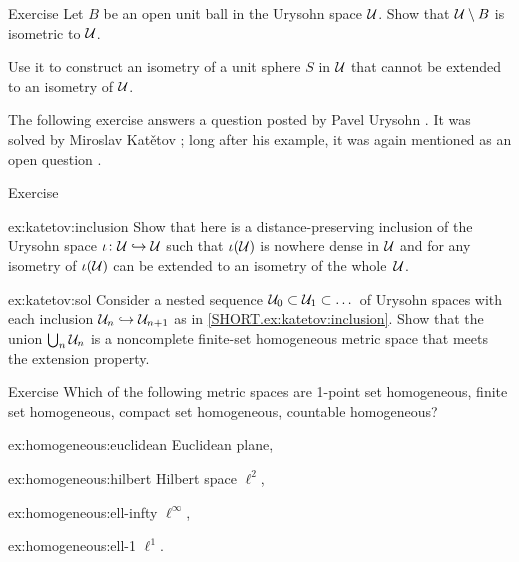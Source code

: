 \begin{thm}{Exercise}\label{ex:ext(shere)}
Let $B$ be an open unit ball in the Urysohn space $\mathcal{U}$.
Show that $\mathcal{U}\setminus B$ is isometric to $\mathcal{U}$.

Use it to construct an isometry of a unit sphere $S$ in $\mathcal{U}$ that cannot be extended to an isometry of $\mathcal{U}$.
\end{thm}

The following exercise answers a question posted by Pavel Urysohn \cite[§$2(6)$]{urysohn}.
It was solved by Miroslav Katětov \cite{katetov};
long after his example, it was again mentioned as an open question \cite[p. 83]{gromov-2007}.

\begin{thm}{Exercise}\label{ex:katetov}

\begin{subthm}{ex:katetov:inclusion}
Show that here is a distance-preserving inclusion of the Urysohn space $\iota\colon\mathcal{U}\hookrightarrow \mathcal{U}$ 
such that $\iota(\mathcal{U})$ is nowhere dense in $\mathcal{U}$ and for any isometry of $\iota(\mathcal{U})$ 
can be extended to an isometry of the whole~$\mathcal{U}$.
\end{subthm}

\begin{subthm}{ex:katetov:sol}
Consider a nested sequence $\mathcal{U}_0\subset \mathcal{U}_1\subset\dots$ of Urysohn spaces 
with each inclusion $\mathcal{U}_n\hookrightarrow \mathcal{U}_{n+1}$ as in \ref{SHORT.ex:katetov:inclusion}.
Show that the union $\bigcup_n\mathcal{U}_n$ is a noncomplete finite-set homogeneous metric space that meets the extension property.
\end{subthm}

\end{thm}

\begin{thm}{Exercise}\label{ex:homogeneous}
Which of the following metric spaces are 
1-point set homogeneous, finite set homogeneous, compact set homogeneous, countable homogeneous?

\begin{subthm}{ex:homogeneous:euclidean}
Euclidean plane,
\end{subthm}

\begin{subthm}{ex:homogeneous:hilbert}
 Hilbert space $\ell^2$,
\end{subthm}

\begin{subthm}{ex:homogeneous:ell-infty}
 $\ell^\infty$,
\end{subthm}

\begin{subthm}{ex:homogeneous:ell-1}
 $\ell^1$.
\end{subthm}
\end{thm}


